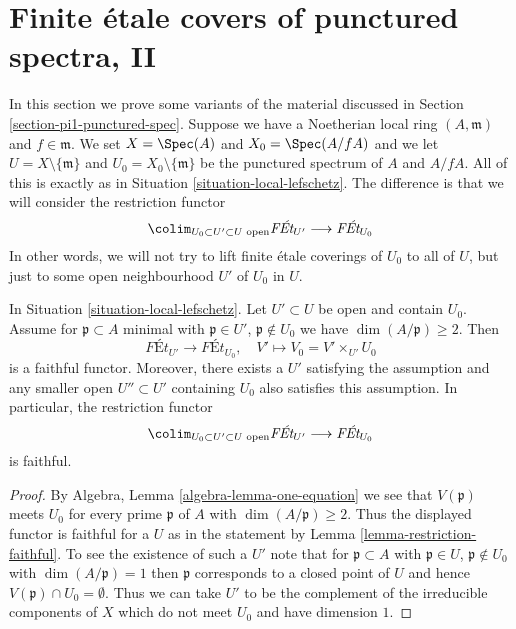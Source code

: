 
















\section{Finite \'etale covers of punctured spectra, II}
\label{section-pi1-punctured-spec-II}

\noindent
In this section we prove some variants of the material discussed
in Section \ref{section-pi1-punctured-spec}. Suppose
we have a Noetherian local ring $(A, \mathfrak m)$ and $f \in \mathfrak m$.
We set $X = \Spec(A)$ and $X_0 = \Spec(A/fA)$ and we
let $U = X \setminus \{\mathfrak m\}$ and
$U_0 = X_0 \setminus \{\mathfrak m\}$ be the punctured spectrum of
$A$ and $A/fA$. All of this is exactly as in
Situation \ref{situation-local-lefschetz}.
The difference is that we will consider the restriction functor
$$
\colim_{U_0 \subset U' \subset U\text{ open}} \textit{F\'Et}_{U'}
\longrightarrow
\textit{F\'Et}_{U_0}
$$
In other words, we will not try to lift finite \'etale coverings
of $U_0$ to all of $U$, but just to some open neighbourhood
$U'$ of $U_0$ in $U$.

\begin{lemma}
\label{lemma-faithful-general}
In Situation \ref{situation-local-lefschetz}. Let $U' \subset U$
be open and contain $U_0$. Assume for $\mathfrak p \subset A$ minimal
with $\mathfrak p \in U'$, $\mathfrak p \not \in U_0$ we have
$\dim(A/\mathfrak p) \geq 2$. Then
$$
\textit{F\'Et}_{U'} \longrightarrow \textit{F\'Et}_{U_0},\quad
V' \longmapsto V_0 = V' \times_{U'} U_0
$$
is a faithful functor. Moreover, there exists a $U'$ satisfying
the assumption and any smaller open $U'' \subset U'$ containing
$U_0$ also satisfies this assumption. In particular, the restriction
functor
$$
\colim_{U_0 \subset U' \subset U\text{ open}} \textit{F\'Et}_{U'}
\longrightarrow
\textit{F\'Et}_{U_0}
$$
is faithful.
\end{lemma}

\begin{proof}
By Algebra, Lemma \ref{algebra-lemma-one-equation}
we see that $V(\mathfrak p)$ meets $U_0$ for
every prime $\mathfrak p$ of $A$ with $\dim(A/\mathfrak p) \geq 2$.
Thus the displayed functor is faithful for a $U$ as in the statement
by Lemma \ref{lemma-restriction-faithful}.
To see the existence of such a $U'$ note that for
$\mathfrak p \subset A$ with $\mathfrak p \in U$,
$\mathfrak p \not \in U_0$ with $\dim(A/\mathfrak p) = 1$
then $\mathfrak p$ corresponds to a closed point of $U$
and hence $V(\mathfrak p) \cap U_0 = \emptyset$.
Thus we can take $U'$ to be the complement of the irreducible
components of $X$ which do not meet $U_0$ and have dimension $1$.
\end{proof}

